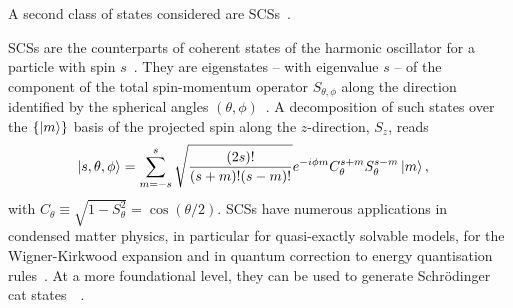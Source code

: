 A second class of states considered are \acp{SCS}~\cite{agarwal1997atomic}.


\acfp{SCS} are the counterparts of coherent states of the harmonic oscillator for a particle with spin $s$~\cite{radcliffe1971some,arecchi1972atomic,agarwal1997atomic,markham2003classicality}. They are eigenstates -- with eigenvalue $s$ -- of the component of the total spin-momentum operator $S_{\theta,\phi}$ along the direction identified by the spherical angles $(\theta, \phi)$~\cite{arecchi1972atomic,agarwal1997atomic,ulyanov1999spin,lee2015visualizing}.
A decomposition of such states over the $\{\ket{m}\}$ basis of the projected spin along the $z$-direction, $S_z$, reads
\begin{equation}
\begin{aligned}
	\ket{s,\theta,\phi} &=
		\sum_{m=-s}^{s}
		\sqrt{\frac{(2s)!}{(s+m)!(s-m)!}} e^{-i\phi m} C_\theta^{s+m} S_\theta^{s-m}\ket{m},
\end{aligned}
\label{spin_coherent1}
\end{equation}
with $C_\theta\equiv\sqrt{1-S^2_\theta}=\cos(\theta/2)$. \acp{SCS} have numerous applications in condensed matter physics, in particular for quasi-exactly solvable models, for the Wigner-Kirkwood expansion and in quantum correction to energy quantisation rules~\cite{ulyanov1999spin}. At a more foundational level, they can be used to generate Schrödinger cat states~~\cite{agarwal1997atomic}. 


